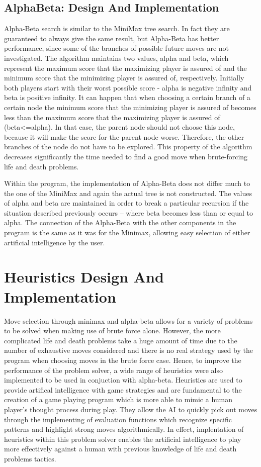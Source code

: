 \documentclass{l3proj}
\begin{document}
\subsection{AlphaBeta: Design And Implementation}

Alpha-Beta search is similar to the MiniMax tree search. In fact they are guaranteed to always give the same result, but Alpha-Beta has better performance, since some of the branches of possible future moves are not investigated. The algorithm maintains two values, alpha and beta, which represent the maximum score that the maximizing player is assured of and the minimum score that the minimizing player is assured of, respectively. Initially both players start with their worst possible score - alpha is negative infinity and beta is positive infinity. It can happen that when choosing a certain branch of a certain node the minimum score that the minimizing player is assured of becomes less than the maximum score that the maximizing player is assured of (beta<=alpha). In that case, the parent node should not choose this node, because it will make the score for the parent node worse. Therefore, the other branches of the node do not have to be explored. This property of the algorithm decreases significantly the time needed to find a good move when brute-forcing life and death problems.

Within the program, the implementation of Alpha-Beta does not differ much to the one of the MiniMax and again the actual tree is not constructed. The values of alpha and beta are maintained in order to break a particular recursion if the situation described previously occurs – where beta becomes less than or equal to alpha. The connection of the Alpha-Beta with the other components in the program is the same as it was for the Minimax, allowing easy selection of either artificial intelligence by the user.

\section{Heuristics Design And Implementation}

Move selection through minimax and alpha-beta allows for a variety of problems to be solved when making use of brute force alone. However, the more complicated life and death problems take a huge amount of time due to the number of exhaustive moves considered and there is no real strategy used by the program when choosing moves in the brute force case. Hence, to improve the performance of the problem solver, a wide range of heuristics were also implemented to be used in conjuction with alpha-beta. Heuristics are used to provide artifical intelligence with game strategies and are fundamental to the creation of a game playing program which is more able to mimic a human player's thought process during play. They allow the AI to quickly pick out moves through the implementing of evaluation functions which recognize specific patterns and highlight strong moves algorithmically. In effect, implentation of heuristics within this problem solver enables the artificial intelligence to play more effectively against a human with previous knowledge of life and death problems tactics.
\end{document}
